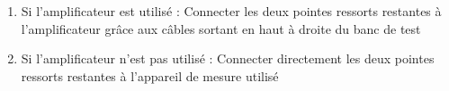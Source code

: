 \begin{enumerate}
    \item Si l'amplificateur est utilisé : Connecter les deux pointes ressorts restantes à l'amplificateur grâce aux câbles sortant en haut
          à droite du banc de test\\

    \item Si l'amplificateur n'est pas utilisé : Connecter directement les deux pointes ressorts restantes à l'appareil de mesure utilisé
\end{enumerate}
